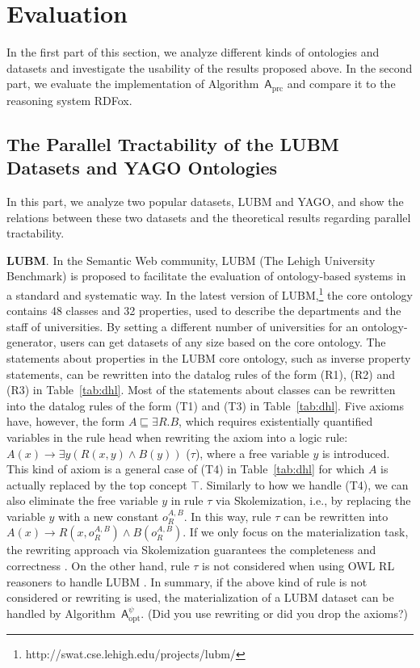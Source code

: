 \section{Evaluation}
\label{sec:evaluation}

In the first part of this section, we analyze different kinds of ontologies and datasets
and investigate the usability of the results proposed above.
In the second part, we evaluate the implementation of Algorithm~$\mathsf{A}_{\text{prc}}$
and compare it to the reasoning system RDFox.

\subsection{The Parallel Tractability of the LUBM Datasets and YAGO Ontologies}

In this part, we analyze two popular datasets, LUBM and YAGO, and show the relations
between these two datasets and the theoretical results regarding parallel tractability.

\textbf{LUBM}. In the Semantic Web community, LUBM
(The Lehigh University Benchmark) is proposed to
facilitate the evaluation of ontology-based systems
in a standard and systematic way.
In the latest version of LUBM,\footnote{http://swat.cse.lehigh.edu/projects/lubm/}
the core ontology contains 48 classes and 32 properties, used to describe the departments and the staff of
universities. By setting a different number of universities for an ontology-generator, users can get datasets of any size based on the core ontology.
%
The statements about properties in the LUBM core ontology, such as inverse property statements,
can be rewritten into the datalog rules of the form (R1), (R2) and (R3) in Table~\ref{tab:dhl}.
Most of the statements about classes can be rewritten into the datalog rules of the form (T1) and (T3)
in Table~\ref{tab:dhl}. Five axioms have, however, the form $A\sqsubseteq\exists R.B$,
which requires existentially quantified variables in the rule head when rewriting
the axiom into a logic rule: $A(x)\rightarrow\exists y(R(x,y)\wedge B(y))$ ($\tau$),
where a free variable $y$ is introduced. This kind of axiom is a general case of (T4) in Table~\ref{tab:dhl}
for which $A$ is actually replaced by the top concept $\top$.
Similarly to how we handle (T4), we can also eliminate the free variable $y$
in rule $\tau$ via Skolemization, i.e., by replacing the variable $y$ with a new constant $o_R^{A,B}$.
In this way, rule $\tau$ can be rewritten into $A(x)\rightarrow R(x,o_R^{A,B})\wedge B(o_R^{A,B})$.
If we only focus on the materialization task, the rewriting approach via Skolemization guarantees the
completeness and correctness \cite{GrauHKKMMW13}.
On the other hand, rule $\tau$ is not considered when using OWL RL reasoners to handle LUBM \cite{UrbaniKMHB12,WeaverH09}.
In summary, if the above kind of rule is not considered {\color{red}
  or rewriting is used},
the materialization of a LUBM dataset can be handled by
Algorithm~$\mathsf{A}_{\text{opt}}^{\psi}$. {\color{red}(Did you use
  rewriting or did you drop the axioms?)}


